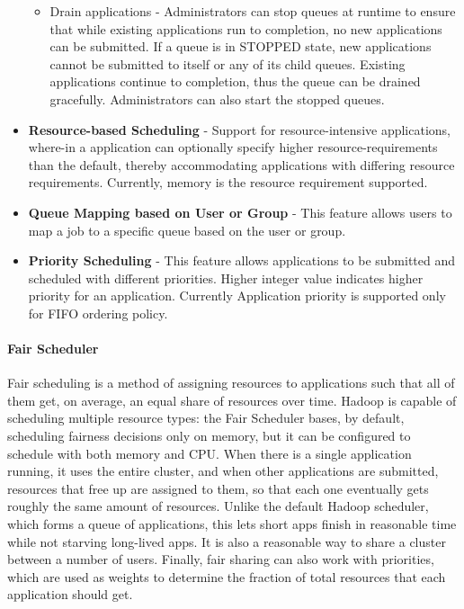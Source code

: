 \begin{itemize}
\begin{itemize}
    \item Drain applications - Administrators can stop queues at runtime to ensure that while existing applications run to completion, no new applications can be submitted. If a queue is in STOPPED state, new applications cannot be submitted to itself or any of its child queues. Existing applications continue to completion, thus the queue can be drained gracefully. Administrators can also start the stopped queues.
    \end{itemize}

\item \textbf{Resource-based Scheduling} - Support for resource-intensive applications, where-in a application can optionally specify higher resource-requirements than the default, thereby accommodating applications with differing resource requirements. Currently, memory is the resource requirement supported.

\item \textbf{Queue Mapping based on User or Group} - This feature allows users to map a job to a specific queue based on the user or group.

\item \textbf{Priority Scheduling} - This feature allows applications to be submitted and scheduled with different priorities. Higher integer value indicates higher priority for an application. Currently Application priority is supported only for FIFO ordering policy.

\end{itemize}

\paragraph{Fair Scheduler}

Fair scheduling is a method of assigning resources to applications such that all of them get, on average, an equal share of resources over time. Hadoop is capable of scheduling multiple resource types:  the Fair Scheduler bases, by default, scheduling fairness decisions only on memory, but it can be configured to schedule with both memory and CPU. When there is a single application running, it uses the entire cluster, and when other applications are submitted, resources that free up are assigned to them, so that each one eventually gets roughly the same amount of resources. Unlike the default Hadoop scheduler, which forms a queue of applications, this lets short apps finish in reasonable time while not starving long-lived apps. It is also a reasonable way to share a cluster between a number of users. Finally, fair sharing can also work with priorities, which are used as weights to determine the fraction of total resources that each application should get.

